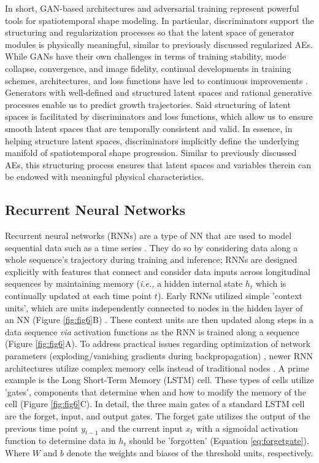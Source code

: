 		In short, GAN-based architectures and adversarial training represent powerful tools for spatiotemporal shape modeling. In particular, discriminators support the structuring and regularization processes so that the latent space of generator modules is physically meaningful, similar to previously discussed regularized AEs. While GANs have their own challenges in terms of training stability, mode collapse, convergence, and image fidelity, continual developments in training schemes, architectures, and loss functions have led to continuous improvements \cite{Yi2019, Gui2023, Saxena2021}. Generators with well-defined and structured latent spaces and rational generative processes enable us to predict growth trajectories. Said structuring of latent spaces is facilitated by discriminators and loss functions, which allow us to ensure smooth latent spaces that are temporally consistent and valid. In essence, in helping structure latent spaces, discriminators implicitly define the underlying manifold of spatiotemporal shape progression. Similar to previously discussed AEs, this structuring process ensures that latent spaces and variables therein can be endowed with meaningful physical characteristics.   			

	\subsection{Recurrent Neural Networks}
	
		Recurrent neural networks (RNNs) are a type of NN that are used to model sequential data such as a time series \cite{Lipton2015, Salehinejad2018, Staudemeyer2019}. They do so by considering data along a whole sequence's trajectory during training and inference; RNNs are designed explicitly with features that connect and consider data inputs across longitudinal sequences by maintaining memory (\textit{i.e.,} a hidden internal state $h_{t}$ which is continually updated at each time point $t$). Early RNNs utilized simple 'context units', which are units independently connected to nodes in the hidden layer of an NN (Figure \ref{fig:fig6}B) \cite{Elman1990}. These context units are then updated along steps in a data sequence \textit{via} activation functions as the RNN is trained along a sequence (Figure \ref{fig:fig6}A). To address practical issues regarding optimization of network parameters (exploding/vanishing gradients during backpropagation) \cite{Lipton2015, Salehinejad2018, Staudemeyer2019}, newer RNN architectures utilize complex memory cells instead of traditional nodes \cite{Hochreiter1997, Yu2019, Chung2014}. A prime example is the Long Short-Term Memory (LSTM) cell. These types of cells utilize 'gates', components that determine when and how to modify the memory of the cell (Figure \ref{fig:fig6}C). In detail, the three main gates of a standard LSTM cell are the forget, input, and output gates. The forget gate utilizes the output of the previous time point $y_{t-1}$ and the current input $x_{t}$ with a sigmoidal activation function to determine data in $h_{t}$ should be 'forgotten' (Equation \ref{eq:forgetgate}). Where $W$ and $b$ denote the weights and biases of the threshold units, respectively. 

